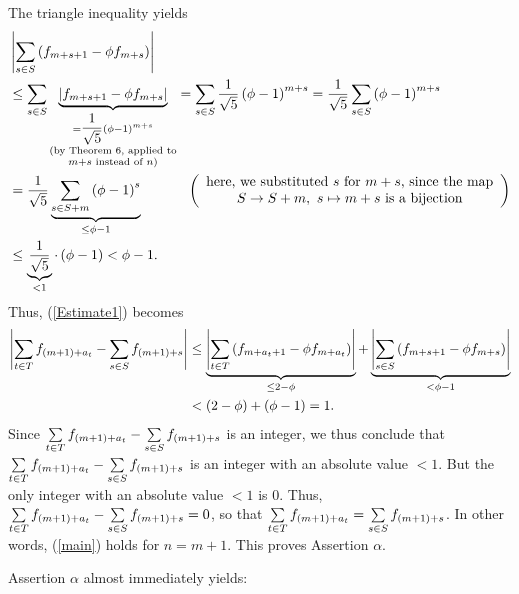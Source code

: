 \documentclass[numbers=enddot,12pt,final,onecolumn,notitlepage]{scrartcl}%
\numberwithin{exer}{section}
\theoremstyle{definition}
\let\sumnonlimits\sum
\renewcommand{\sum}{\sumnonlimits\limits}
\begin{document}
The triangle inequality yields%
\begin{align*}
&  \left\vert \sum\limits_{s\in S}\left(  f_{m+s+1}-\phi f_{m+s}\right)
\right\vert \\
&  \leq\sum\limits_{s\in S}\underbrace{\left\vert f_{m+s+1}-\phi
f_{m+s}\right\vert }_{\substack{=\dfrac{1}{\sqrt{5}}\left(  \phi-1\right)
^{m+s}\\\text{(by Theorem 6, applied to}\\m+s\text{ instead of }n\text{)}%
}}=\sum\limits_{s\in S}\dfrac{1}{\sqrt{5}}\left(  \phi-1\right)  ^{m+s}%
=\dfrac{1}{\sqrt{5}}\sum\limits_{s\in S}\left(  \phi-1\right)  ^{m+s}\\
&  =\dfrac{1}{\sqrt{5}}\underbrace{\sum\limits_{s\in S+m}\left(
\phi-1\right)  ^{s}}_{\leq\phi-1}\ \ \ \ \ \ \ \ \ \ \left(
\begin{array}
[c]{c}%
\text{here, we substituted }s\text{ for }m+s\text{, since the map}\\
S\rightarrow S+m,\ s\mapsto m+s\text{ is a bijection}%
\end{array}
\right) \\
&  \leq\underbrace{\dfrac{1}{\sqrt{5}}}_{<1}\cdot\left(  \phi-1\right)
<\phi-1.
\end{align*}
Thus, (\ref{Estimate1}) becomes%
\begin{align}
\left\vert \sum\limits_{t\in T}f_{\left(  m+1\right)  +a_{t}}-\sum
\limits_{s\in S}f_{\left(  m+1\right)  +s}\right\vert  &  \leq
\underbrace{\left\vert \sum\limits_{t\in T}\left(  f_{m+a_{t}+1}-\phi
f_{m+a_{t}}\right)  \right\vert }_{\leq2-\phi}+\underbrace{\left\vert
\sum\limits_{s\in S}\left(  f_{m+s+1}-\phi f_{m+s}\right)  \right\vert
}_{<\phi-1}\nonumber\\
&  <\left(  2-\phi\right)  +\left(  \phi-1\right)  =1.\nonumber
\end{align}
Since $\sum\limits_{t\in T}f_{\left(  m+1\right)  +a_{t}}-\sum\limits_{s\in
S}f_{\left(  m+1\right)  +s}$ is an integer, we thus conclude that
$\sum\limits_{t\in T}f_{\left(  m+1\right)  +a_{t}}-\sum\limits_{s\in
S}f_{\left(  m+1\right)  +s}$ is an integer with an absolute value $<1$. But
the only integer with an absolute value $<1$ is $0$. Thus, $\sum\limits_{t\in
T}f_{\left(  m+1\right)  +a_{t}}-\sum\limits_{s\in S}f_{\left(  m+1\right)
+s}=0$, so that $\sum\limits_{t\in T}f_{\left(  m+1\right)  +a_{t}}%
=\sum\limits_{s\in S}f_{\left(  m+1\right)  +s}$. In other words, (\ref{main})
holds for $n=m+1$. This proves Assertion $\alpha$.

Assertion $\alpha$ almost immediately yields:
\end{document}
